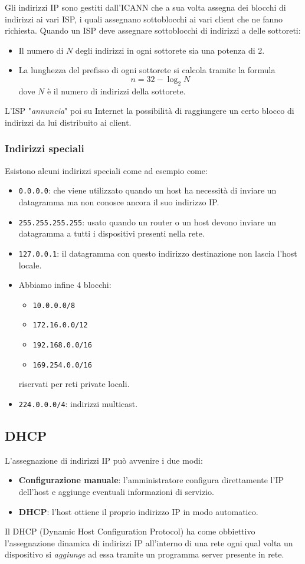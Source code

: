 Gli indirizzi IP sono gestiti dall'ICANN che a sua volta assegna dei 
blocchi di indirizzi ai vari ISP, i quali assegnano sottoblocchi ai 
vari client che ne fanno richiesta. Quando un ISP deve assegnare 
sottoblocchi di indirizzi a delle sottoreti:
\begin{itemize}
	\item Il numero di $N$ degli indirizzi in ogni sottorete sia una 
		potenza di 2.
	\item La lunghezza del prefisso di ogni sottorete si calcola 
		tramite la formula
		\[ n = 32 - \log_2 N \]
		dove $N$ è il numero di indirizzi della sottorete.
\end{itemize}
L'ISP "\emph{annuncia}" poi su Internet la possibilità di raggiungere 
un certo blocco di indirizzi da lui distribuito ai client.

\subsubsection{Indirizzi speciali}
Esistono alcuni indirizzi speciali come ad esempio come:
\begin{itemize}
	\item \verb|0.0.0.0|: che viene utilizzato quando un host ha 
		necessità di inviare un datagramma ma non conosce ancora il 
		suo indirizzo IP.
	\item \verb|255.255.255.255|: usato quando un router o un host 
		devono inviare un datagramma a tutti i dispositivi presenti 
		nella rete.
	\item \verb|127.0.0.1|: il datagramma con questo indirizzo 
		destinazione non lascia l'host locale.
	\item Abbiamo infine 4 blocchi:
		\begin{itemize}
			\item \verb|10.0.0.0/8|
			\item \verb|172.16.0.0/12|
			\item \verb|192.168.0.0/16|
			\item \verb|169.254.0.0/16|
		\end{itemize}
		riservati per reti private locali.
	\item \verb|224.0.0.0/4|: indirizzi multicast.
\end{itemize}

\subsection{DHCP}
L'assegnazione di indirizzi IP può avvenire i due modi:
\begin{itemize}
	\item \textbf{Configurazione manuale}: l'amministratore configura 
		direttamente l'IP dell'host e aggiunge eventuali informazioni 
		di servizio.
	\item \textbf{DHCP}: l'host ottiene il proprio indirizzo IP in 
		modo automatico.
\end{itemize}
Il DHCP (Dynamic Host Configuration Protocol) ha come obbiettivo 
l'assegnazione dinamica di indirizzi IP all'interno di una rete ogni
qual volta un dispositivo si \emph{aggiunge} ad essa tramite un 
programma server presente in rete.

